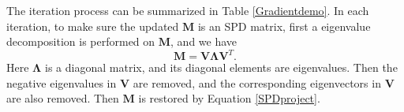  The iteration process can be summarized in Table \ref{Gradientdemo}.
%
In each iteration, to make sure the updated $\bm{M}$ is an SPD matrix, first a eigenvalue decomposition is performed on $\bm{M}$, and we have
\begin{equation}\label{SPDproject}
\bm{M} = \bm{V}\bm{\Lambda}\bm{V}^T.
\end{equation}
Here $\bm{\Lambda}$ is a diagonal matrix, and its diagonal elements are eigenvalues. Then the negative eigenvalues in $\bm{V}$ are removed, and the corresponding eigenvectors in $\bm{V}$ are also removed. Then $\bm{M}$ is restored by Equation \eqref{SPDproject}.

